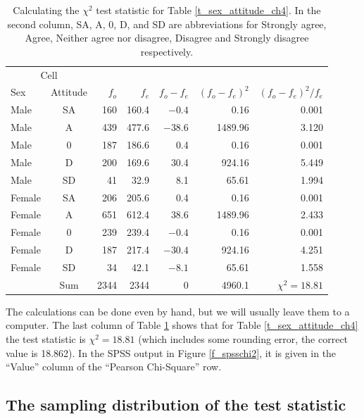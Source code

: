 \begin{table}
\caption{Calculating the $\chi^{2}$ test statistic for Table
\ref{t_sex_attitude_ch4}. In the second column,
SA, A, 0, D, and SD are abbreviations
for Strongly agree, Agree, Neither agree nor disagree, Disagree and
Strongly disagree respectively.}
\label{t_sex_attitude_chi2}
\begin{center}
\begin{tabular}{|lc|rrrrr|}\hline
\multicolumn{2}{|c|}{Cell} & & & & & \\
Sex & Attitude & $f_{o}$ & $f_{e}$ & $f_{o}-f_{e}$ & $(f_{o}-f_{e})^{2}$ &
$(f_{o}-f_{e})^{2}/f_{e}$\\
\hline
Male & SA & 160 & 160.4 & $-0.4$& 0.16& 0.001 \\
Male & A & 439 & 477.6 & $-38.6$ & 1489.96& 3.120 \\
Male & 0 & 187 & 186.6 & 0.4& 0.16& 0.001 \\
Male & D & 200 & 169.6 & 30.4& 924.16& 5.449 \\
Male & SD & 41 & 32.9 & 8.1& 65.61& 1.994 \\
Female & SA & 206 & 205.6 & 0.4& 0.16 & 0.001 \\
Female & A & 651 & 612.4 & 38.6& 1489.96& 2.433 \\
Female & 0 & 239 & 239.4 & $-0.4$& 0.16& 0.001 \\
Female & D & 187 & 217.4 & $-30.4$& 924.16& 4.251 \\
Female & SD & 34 & 42.1 & $-8.1$& 65.61& 1.558 \\
\hline
& Sum & 2344& 2344 & 0 & 4960.1& $\chi^{2}=18.81$ \\
\hline
\end{tabular}
\end{center}
\end{table}

The calculations can be done even by hand, but we will
usually leave them to a computer. The last column of Table
\ref{t_sex_attitude_chi2} shows that for Table \ref{t_sex_attitude_ch4}
the test statistic is $\chi^{2}=18.81$ (which includes some rounding
error, the correct value is 18.862). In the SPSS output in Figure
\ref{f_spsschi2}, it is given in the ``Value'' column of the
``Pearson Chi-Square'' row.


\subsection{The sampling distribution of the test statistic}
\label{ss_tables_chi2test_sdist}

